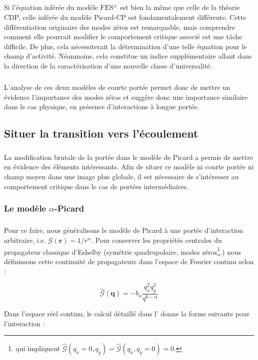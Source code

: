 \subparagraph{}Si l'équation inférée du modèle $\text{FES}^\pm$ est bien la même que celle de la théorie CDP, celle inférée du modèle Picard-CP est fondamentalement différente. Cette différentiation originaire des modes zéros est remarquable, mais comprendre comment elle pourrait modifier le comportement critique associé est une tâche difficile. De plus, cela nécessiterait la détermination d'une telle équation pour le champ d'activité. Néanmoins, cela constitue un indice supplémentaire allant dans la direction de la caractérisation d'une nouvelle classe d'universalité.

\subparagraph{}L'analyse de ces deux modèles de courte portée permet donc de mettre un évidence l'importance des modes zéros et suggère donc une importance similaire dans le cas physique, en présence d'interactions à longue portée.

\subsection{Situer la transition vers l'écoulement}

\label{sec:alphaPicard}

\subparagraph{}La modification brutale de la portée dans le modèle de Picard a permis de mettre en évidence des éléments intéressants. Afin de situer ce modèle ni courte portée ni champ moyen dans une image plus globale, il est nécessaire de s'intéresser au comportement critique dans le cas de portées intermédiaires. 

\subsubsection{Le modèle $\alpha$-Picard}

\subparagraph{}Pour ce faire, nous généralisons le modèle de Picard à une portée d'interaction arbitraire, i.e. $\mathcal{G}(\mathbf{r})\sim 1/r^\alpha$. Pour conserver les propriétés centrales du propagateur classique d'Eshelby (symétrie quadrupolaire, modes zéros\footnote{qui impliquent $\hat{\mathcal{G}}(q_x=0,q_y)=\hat{\mathcal{G}}(q_x,q_y=0)=0$.}.) nous définissons cette continuité de propagateurs dans l'espace de Fourier continu selon :

\begin{equation}
	\hat{\mathcal{G}}(\mathbf{q}) = -b_\alpha \frac{q_x^2 q_y^2}{q^{6-\alpha}}
\end{equation}

\noindent Dans l'espace réel continu, le calcul détaillé dans l' donne la forme suivante pour l'interaction :

